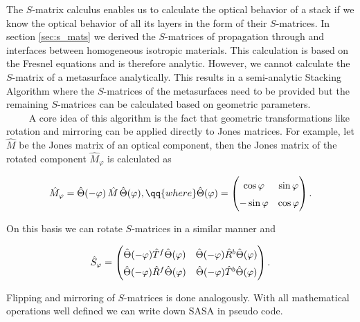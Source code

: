 The $S$-matrix calculus enables us to calculate the optical behavior of a stack if we know the optical behavior of all its layers in the form of their $S$-matrices. In section \ref{sec:s_mats} we derived the $S$-matrices of propagation through and interfaces between homogeneous isotropic materials. This calculation is based on the Fresnel equations and is therefore analytic.
However, we cannot calculate the $S$-matrix of a metasurface analytically. This results in a semi-analytic Stacking Algorithm where the $S$-matrices of the metasurfaces need to be provided but the remaining $S$-matrices can be calculated based on geometric parameters.
\\


$\qquad$ A core idea of this algorithm is the fact that geometric transformations like rotation and mirroring can be applied directly to Jones matrices. For example, let $\hat M$ be the Jones matrix of an optical component, then the Jones matrix of the rotated component $\hat{M}_{\varphi}$ is calculated as

\begin{equation}
    \hat{M}_{\varphi} = 
    \hat \Theta(-\varphi) \, \hat{M} \, \hat \Theta(\varphi),
    \qq{where}
    \hat \Theta(\varphi) =
    \begin{pmatrix}
        \cos \varphi & \sin \varphi \\
        -\sin \varphi & \cos \varphi
    \end{pmatrix}.
\end{equation}

On this basis we can rotate $S$-matrices in a similar manner and

\begin{equation}
    \hat S_\varphi =
    \begingroup
    \renewcommand*{\arraystretch}{1.5}
        \begin{pmatrix}
            \hat \Theta(-\varphi) \hat T^f \hat \Theta(\varphi)&
            \hat \Theta(-\varphi) \hat R^b \hat \Theta(\varphi)\\
            \hat \Theta(-\varphi) \hat R^f \hat \Theta(\varphi)&
            \hat \Theta(-\varphi) \hat T^b \hat \Theta(\varphi)
        \end{pmatrix}
    \endgroup.
\end{equation}

Flipping and mirroring of $S$-matrices is done analogously. With all mathematical operations well defined we can write down SASA in pseudo code.


